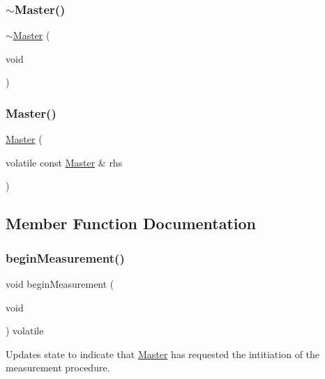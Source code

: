 \subsubsection{\texorpdfstring{$\sim$Master()}{~Master()}}
{\footnotesize\ttfamily $\sim$\mbox{\hyperlink{class_master}{Master}} (\begin{DoxyParamCaption}\item[{void}]{ }\end{DoxyParamCaption})}

\mbox{\label{class_master_a339116daf8910b52da4d608c8c7b3944}} 
\subsubsection{\texorpdfstring{Master()}{Master()}\hspace{0.1cm}{\footnotesize\ttfamily [3/3]}}
{\footnotesize\ttfamily \mbox{\hyperlink{class_master}{Master}} (\begin{DoxyParamCaption}\item[{volatile const \mbox{\hyperlink{class_master}{Master}} \&}]{rhs }\end{DoxyParamCaption})}



\subsection{Member Function Documentation}
\mbox{\label{class_master_a89cc4d6f65ee9922711cde4ed4bdf31c}} 
\subsubsection{\texorpdfstring{beginMeasurement()}{beginMeasurement()}}
{\footnotesize\ttfamily void begin\+Measurement (\begin{DoxyParamCaption}\item[{void}]{ }\end{DoxyParamCaption}) volatile}



Updates state to indicate that \mbox{\hyperlink{class_master}{Master}} has requested the intitiation of the measurement procedure. 

